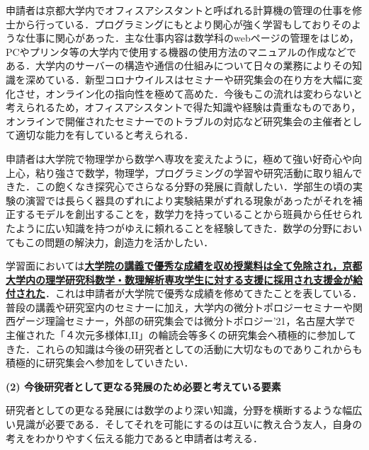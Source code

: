 \documentclass[11pt,a4j,dvipdfmx]{jarticle} 					%
\newcommand{\研究課題名}{象の卵}
\newcommand{\研究機関名}{京都大学}
\newcommand{\研究代表者氏名}{福士謙二}
\begin{document}
\noindent
{}

申請者は京都大学内でオフィスアシスタントと呼ばれる計算機の管理の仕事を修士から行っている．プログラミングにもとより関心が強く学習もしておりそのような仕事に関心があった．主な仕事内容は数学科のwebページの管理をはじめ，PCやプリンタ等の大学内で使用する機器の使用方法のマニュアルの作成などである．大学内のサーバーの構造や通信の仕組みについて日々の業務によりその知識を深めている．新型コロナウイルスはセミナーや研究集会の在り方を大幅に変化させ，オンライン化の指向性を極めて高めた．今後もこの流れは変わらないと考えられるため，オフィスアシスタントで得た知識や経験は貴重なものであり，オンラインで開催されたセミナーでのトラブルの対応など研究集会の主催者として適切な能力を有していると考えられる．



\noindent
{}


申請者は大学院で物理学から数学へ専攻を変えたように，極めて強い好奇心や向上心，粘り強さで数学，物理学，プログラミングの学習や研究活動に取り組んできた．この飽くなき探究心でさらなる分野の発展に貢献したい．学部生の頃の実験の演習では長らく器具のずれにより実験結果がずれる現象があったがそれを補正するモデルを創出することを，数学力を持っていることから班員から任せられたように広い知識を持つがゆえに頼れることを経験してきた．数学の分野においてもこの問題の解決力，創造力を活かしたい．

学習面においては\textbf{\ul{大学院の講義で優秀な成績を収め授業料は全て免除され，京都大学内の理学研究科数学・数理解析専攻学生に対する支援に採用され支援金が給付された}}．これは申請者が大学院で優秀な成績を修めてきたことを表している．
普段の講義や研究室内のセミナーに加え，大学内の微分トポロジーセミナーや関西ゲージ理論セミナー，外部の研究集会では微分トポロジー'21，名古屋大学で主催された「４次元多様体I,II」の輪読会等多くの研究集会へ積極的に参加してきた．これらの知識は今後の研究者としての活動に大切なものでありこれからも積極的に研究集会へ参加をしていきたい．





\vspace{5mm}
\noindent
\textbf{(2) 今後研究者として更なる発展のため必要と考えている要素}


研究者としての更なる発展には数学のより深い知識，分野を横断するような幅広い見識が必要である．そしてそれを可能にするのは互いに教え合う友人，自身の考えをわかりやすく伝える能力であると申請者は考える．


\noindent
{}
\end{document}
